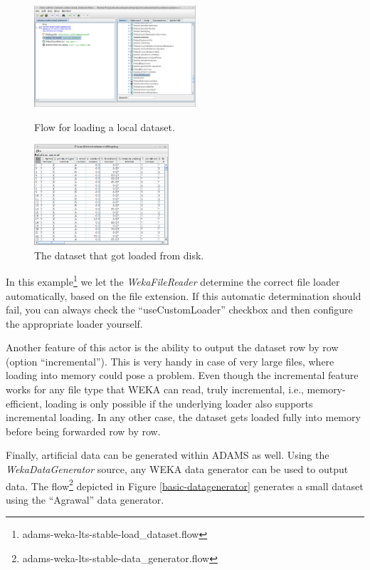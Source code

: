 \begin{figure}[ht]
  \begin{minipage}[t]{0.5\linewidth}
    \centering
    \includegraphics[width=6.0cm]{images/basic-load_local_dataset.png}
    \caption{Flow for loading a local dataset.}
    \label{basic-load_local_dataset}
  \end{minipage}
  \hspace{0.5cm}
  \begin{minipage}[t]{0.5\linewidth}
    \centering
    \includegraphics[width=5.0cm]{images/basic-load_local_dataset-output.png}
    \caption{The dataset that got loaded from disk.}
    \label{basic-load_local_dataset-output}
  \end{minipage}
\end{figure}

In this example\footnote{adams-weka-lts-stable-load\_dataset.flow} we let the
\textit{WekaFileReader} determine the correct file loader automatically, based
on the file extension. If this automatic determination should fail, you can
always check the ``useCustomLoader'' checkbox and then configure the appropriate
loader yourself.

Another feature of this actor is the ability to output the dataset row by row
(option ``incremental''). This is very handy in case of very large files, where
loading into memory could pose a problem. Even though the incremental feature
works for any file type that WEKA can read, truly incremental, i.e.,
memory-efficient, loading is only possible if the underlying loader also
supports incremental loading. In any other case, the dataset gets loaded fully
into memory before being forwarded row by row.

Finally, artificial data can be generated within ADAMS as well. Using the
\textit{WekaDataGenerator} source, any WEKA data generator can be used to output
data. The flow\footnote{adams-weka-lts-stable-data\_generator.flow} depicted in Figure
\ref{basic-datagenerator} generates a small dataset using the ``Agrawal'' data
generator.

